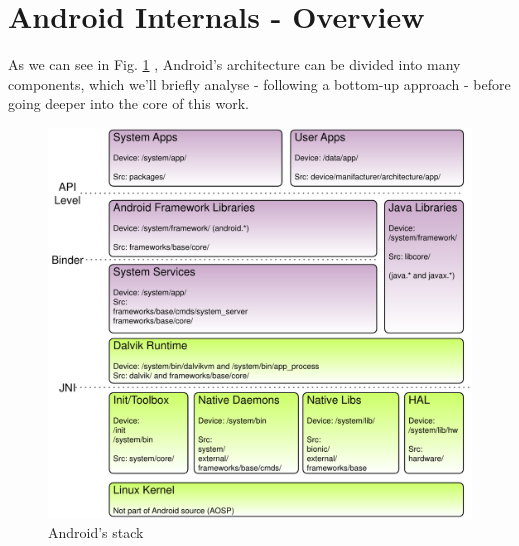 
\section{Android Internals - Overview}
As we can see in Fig. \ref{fig:stack} \cite{remixingand}, Android's architecture can be divided into many components, which we'll briefly analyse - following a bottom-up approach - before going deeper into the core of this work.
\begin{figure}[!htb]
	\centering
	\includegraphics[scale=.6]{images/stack.pdf}
	\caption{Android's stack}
	\label{fig:stack}
\end{figure}
